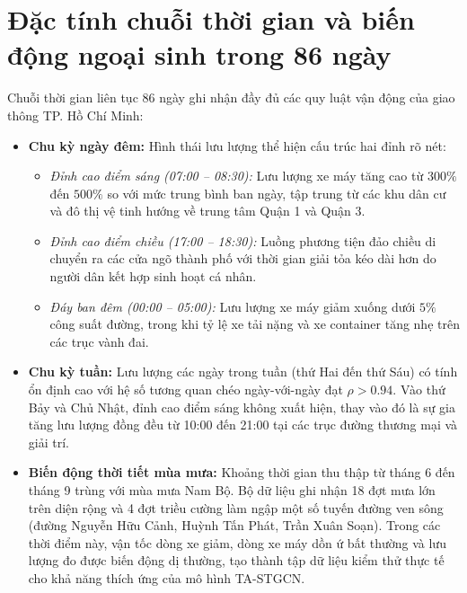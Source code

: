 \section{Đặc tính chuỗi thời gian và biến động ngoại sinh trong 86 ngày}
\label{sec:dac_tinh_chuoi_thoi_gian}

Chuỗi thời gian liên tục 86 ngày ghi nhận đầy đủ các quy luật vận động của giao thông TP. Hồ Chí Minh:
\begin{itemize}
    \item \textbf{Chu kỳ ngày đêm:} Hình thái lưu lượng thể hiện cấu trúc hai đỉnh rõ nét:
    \begin{itemize}
        \item \textit{Đỉnh cao điểm sáng (07:00 -- 08:30):} Lưu lượng xe máy tăng cao từ $300\%$ đến $500\%$ so với mức trung bình ban ngày, tập trung từ các khu dân cư và đô thị vệ tinh hướng về trung tâm Quận 1 và Quận 3.
        \item \textit{Đỉnh cao điểm chiều (17:00 -- 18:30):} Luồng phương tiện đảo chiều di chuyển ra các cửa ngõ thành phố với thời gian giải tỏa kéo dài hơn do người dân kết hợp sinh hoạt cá nhân.
        \item \textit{Đáy ban đêm (00:00 -- 05:00):} Lưu lượng xe máy giảm xuống dưới $5\%$ công suất đường, trong khi tỷ lệ xe tải nặng và xe container tăng nhẹ trên các trục vành đai.
    \end{itemize}
    \item \textbf{Chu kỳ tuần:} Lưu lượng các ngày trong tuần (thứ Hai đến thứ Sáu) có tính ổn định cao với hệ số tương quan chéo ngày-với-ngày đạt $\rho > 0.94$. Vào thứ Bảy và Chủ Nhật, đỉnh cao điểm sáng không xuất hiện, thay vào đó là sự gia tăng lưu lượng đồng đều từ 10:00 đến 21:00 tại các trục đường thương mại và giải trí.
    \item \textbf{Biến động thời tiết mùa mưa:} Khoảng thời gian thu thập từ tháng 6 đến tháng 9 trùng với mùa mưa Nam Bộ. Bộ dữ liệu ghi nhận 18 đợt mưa lớn trên diện rộng và 4 đợt triều cường làm ngập một số tuyến đường ven sông (đường Nguyễn Hữu Cảnh, Huỳnh Tấn Phát, Trần Xuân Soạn). Trong các thời điểm này, vận tốc dòng xe giảm, dòng xe máy dồn ứ bất thường và lưu lượng đo được biến động dị thường, tạo thành tập dữ liệu kiểm thử thực tế cho khả năng thích ứng của mô hình TA-STGCN.
\end{itemize}
